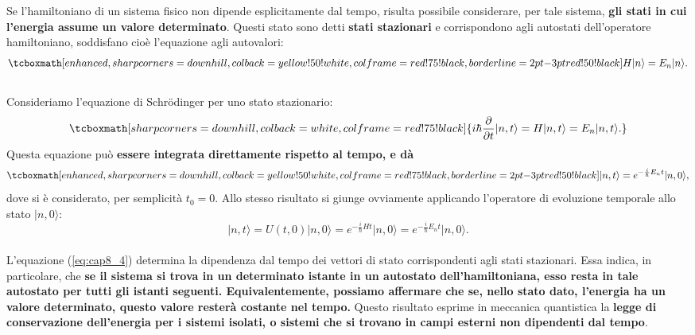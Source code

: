 \documentclass[a4paper,12pt,oneside]{book}
\begin{document}
Se l'hamiltoniano di un sistema fisico non dipende esplicitamente dal tempo, risulta possibile considerare, per tale sistema, \textbf{gli stati in cui l'energia assume un valore determinato}. Questi stato sono detti \textbf{stati stazionari} e corrispondono agli autostati dell'operatore hamiltoniano, soddisfano cioè l'equazione agli autovalori:
	\begin{equation}
		\tcboxmath[enhanced, sharp corners=downhill, colback=yellow!50!white, colframe=red!75!black, borderline={2pt}{-3pt}{red!50!black}]{
			H|n\rangle = E_n |n \rangle.
			}
	\end{equation}\\
	
Consideriamo l'equazione di Schr\"{o}dinger per uno stato stazionario:
	\begin{equation}
		\tcboxmath[sharp corners=downhill, colback=white, colframe=red!75!black]{
			i\hbar \frac{\partial}{\partial t}|n,t\rangle = H |n,t \rangle = E_n |n, t \rangle.
			}
	\end{equation}
Questa equazione può \textbf{essere integrata direttamente rispetto al tempo, e dà}
	\begin{equation}
		\tcboxmath[enhanced, sharp corners=downhill, colback=yellow!50!white, colframe=red!75!black, borderline={2pt}{-3pt}{red!50!black}]{	
			|n,t\rangle = e^{-\frac{i}{\hbar}E_n t}\vert n, 0\rangle,
			}
	\label{eq:cap8_4}
	\end{equation}
dove si è considerato, per semplicità $t_0=0$. Allo stesso risultato si giunge ovviamente applicando l'operatore di evoluzione temporale allo stato $\vert n, 0\rangle$:
	\begin{equation}
		\vert n, t \rangle = U(t,0) \vert n, 0 \rangle = e^{-\frac{i}{\hbar}H t}\vert n, 0\rangle= e^{-\frac{i}{\hbar}E_n t}\vert n, 0\rangle.
	\end{equation}\\

L'equazione (\ref{eq:cap8_4}) determina la dipendenza dal tempo dei vettori di stato corrispondenti agli stati stazionari. Essa indica, in particolare, che \textbf{se il sistema si trova in un determinato istante in un autostato dell'hamiltoniana, esso resta in tale autostato per tutti gli istanti seguenti. Equivalentemente, possiamo affermare che se, nello stato dato, l'energia ha un valore determinato, questo valore resterà costante nel tempo.} Questo risultato esprime in meccanica quantistica la \textbf{legge di conservazione dell'energia per i sistemi isolati, o sistemi che si trovano in campi esterni non dipendenti dal tempo}.\\
\end{document}
